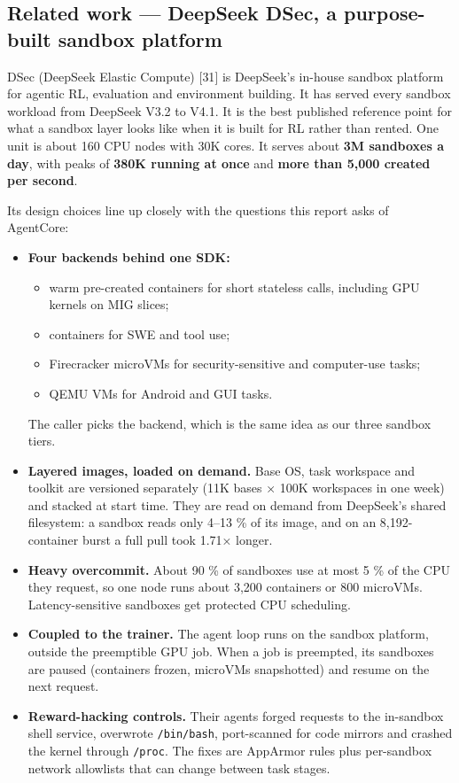 \documentclass[
  paper=a4,
  ,captions=tableheading
]{scrartcl}
\providecommand{\tightlist}{%
  \setlength{\itemsep}{0pt}\setlength{\parskip}{0pt}}
\begin{document}
\hypertarget{related-work-deepseek-dsec-a-purpose-built-sandbox-platform}{%
\subsection{Related work --- DeepSeek DSec, a purpose-built sandbox
platform}\label{related-work-deepseek-dsec-a-purpose-built-sandbox-platform}}

DSec (DeepSeek Elastic Compute) {[}31{]} is DeepSeek's in-house sandbox
platform for agentic RL, evaluation and environment building. It has
served every sandbox workload from DeepSeek V3.2 to V4.1. It is the best
published reference point for what a sandbox layer looks like when it is
built for RL rather than rented. One unit is about 160 CPU nodes with
30K cores. It serves about \textbf{3M sandboxes a day}, with peaks of
\textbf{380K running at once} and \textbf{more than 5,000 created per
second}.

Its design choices line up closely with the questions this report asks
of AgentCore:

\begin{itemize}
\tightlist
\item
  \textbf{Four backends behind one SDK:}

  \begin{itemize}
  \tightlist
  \item
    warm pre-created containers for short stateless calls, including GPU
    kernels on MIG slices;
  \item
    containers for SWE and tool use;
  \item
    Firecracker microVMs for security-sensitive and computer-use tasks;
  \item
    QEMU VMs for Android and GUI tasks.
  \end{itemize}

  The caller picks the backend, which is the same idea as our three
  sandbox tiers.
\item
  \textbf{Layered images, loaded on demand.} Base OS, task workspace and
  toolkit are versioned separately (11K bases × 100K workspaces in one
  week) and stacked at start time. They are read on demand from
  DeepSeek's shared filesystem: a sandbox reads only 4--13 \% of its
  image, and on an 8,192-container burst a full pull took 1.71× longer.
\item
  \textbf{Heavy overcommit.} About 90 \% of sandboxes use at most 5 \%
  of the CPU they request, so one node runs about 3,200 containers or
  800 microVMs. Latency-sensitive sandboxes get protected CPU
  scheduling.
\item
  \textbf{Coupled to the trainer.} The agent loop runs on the sandbox
  platform, outside the preemptible GPU job. When a job is preempted,
  its sandboxes are paused (containers frozen, microVMs snapshotted) and
  resume on the next request.
\item
  \textbf{Reward-hacking controls.} Their agents forged requests to the
  in-sandbox shell service, overwrote \texttt{/bin/bash}, port-scanned
  for code mirrors and crashed the kernel through \texttt{/proc}. The
  fixes are AppArmor rules plus per-sandbox network allowlists that can
  change between task stages.
\end{itemize}
\end{document}
